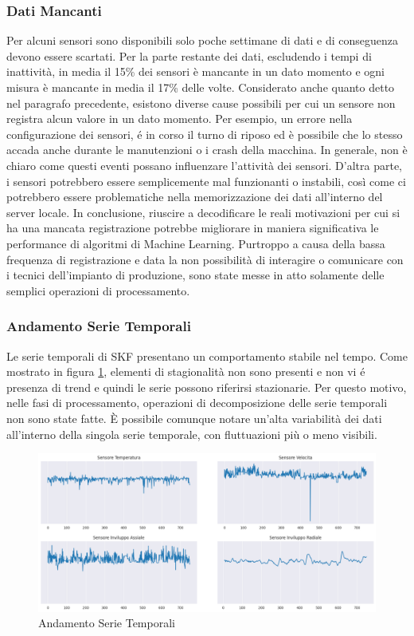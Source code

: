 \subsubsection{Dati Mancanti}
Per alcuni sensori sono disponibili solo poche settimane di dati e di conseguenza devono essere scartati. Per la parte restante dei dati, escludendo i tempi di inattività, in media il 15\% dei sensori è mancante in un dato momento e ogni misura è mancante in media il 17\% delle volte. Considerato anche quanto detto nel paragrafo precedente, esistono diverse cause possibili per cui un sensore non registra alcun valore in un dato momento. Per esempio, un errore nella configurazione dei sensori, é in corso il turno di riposo ed è possibile che lo stesso accada anche durante le manutenzioni o i crash della macchina.
In generale, non è chiaro come questi eventi possano influenzare l'attività dei sensori. D'altra parte, i sensori potrebbero essere semplicemente mal funzionanti o instabili, così come ci potrebbero essere problematiche nella memorizzazione dei dati all'interno del server locale. 
In conclusione, riuscire a decodificare le reali motivazioni per cui si ha una mancata registrazione potrebbe migliorare in maniera significativa le performance di algoritmi di Machine Learning. Purtroppo a causa della bassa frequenza di registrazione e data la non possibilità di interagire o comunicare con i tecnici dell'impianto di produzione, sono state messe in atto solamente delle semplici operazioni di processamento.

\subsubsection{Andamento Serie Temporali}
Le serie temporali di SKF presentano un comportamento stabile nel tempo. Come mostrato in figura \ref{sensors_plot}, elementi di stagionalità non sono presenti e non vi é presenza di trend e quindi le serie possono riferirsi stazionarie.
Per questo motivo, nelle fasi di processamento, operazioni di decomposizione delle serie temporali non sono state fatte.
È possibile comunque notare un'alta variabilità dei dati all'interno della singola serie temporale, con fluttuazioni più o meno visibili.
\begin{figure}[t]
	\centering
	\includegraphics[width=14cm, scale=1]{images/sensors_plot}
	\caption{Andamento Serie Temporali}
	\label{sensors_plot}
		
\end{figure}

